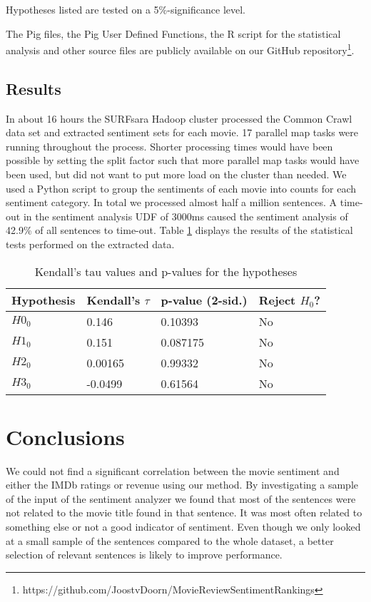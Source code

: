 \documentclass{acm_proc_article-sp}
\begin{document}
Hypotheses listed are tested on a 5\%-significance level.

The Pig files, the Pig User Defined Functions, the R script for the statistical analysis and other source files are publicly available on our GitHub repository\footnote{https://github.com/JoostvDoorn/MovieReviewSentimentRankings}.

\subsection{Results}
In about 16 hours the SURFsara Hadoop cluster processed the Common Crawl data set and extracted sentiment sets for each movie. 17 parallel map tasks were running throughout the process. Shorter processing times would have been possible by setting the split factor such that more parallel map tasks would have been used, but did not want to put more load on the cluster than needed. We used a Python script to group the sentiments of each movie into counts for each sentiment category. In total we processed almost half a million sentences. A time-out in the sentiment analysis UDF of 3000ms caused the sentiment analysis of 42.9\% of all sentences to time-out. Table \ref{tab:hypothesis_tests} displays the results of the statistical tests performed on the extracted data.
\begin{table}
\begin{tabular}{l|lll}
Hypothesis & Kendall's $\tau$ & p-value (2-sid.) & Reject $H_0$?\\
\hline
$H0_0$ & 0.146 & 0.10393 & No \\ 
$H1_0$ & 0.151 & 0.087175 & No \\ 
$H2_0$ & 0.00165 & 0.99332 & No \\ 
$H3_0$ & -0.0499 & 0.61564 & No\\ 
\end{tabular}
\caption{Kendall's tau values and p-values for the hypotheses}
\label{tab:hypothesis_tests}
\end{table}


\section{Conclusions}
We could not find a significant correlation between the movie sentiment and either the IMDb ratings or revenue using our method. By investigating a sample of the input of the sentiment analyzer we found that most of the sentences were not related to the movie title found in that sentence. It was most often related to something else or not a good indicator of sentiment. Even though we only looked at a small sample of the sentences compared to the whole dataset, a better selection of relevant sentences is likely to improve performance.
\end{document}
